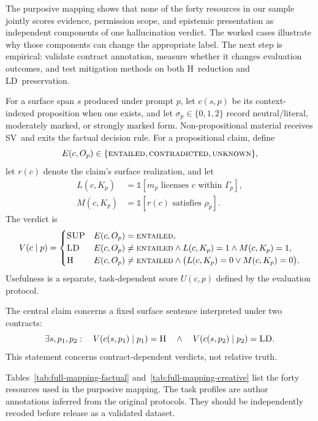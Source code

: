 \documentclass{clv2025}
\newcommand{\LD}{\textsc{LD}}
\newcommand{\Hall}{\textsc{H}}
\newcommand{\SUP}{\textsc{SUP}}
\newcommand{\SV}{\textsc{SV}}
\begin{document}
The purposive mapping shows that none of the forty resources in our sample jointly scores evidence, permission scope, and epistemic presentation as independent components of one hallucination verdict.
The worked cases illustrate why those components can change the appropriate label.
The next step is empirical: validate contract annotation, measure whether it changes evaluation outcomes, and test mitigation methods on both \Hall\ reduction and \LD\ preservation.

\appendix

\label{app:formal}

For a surface span $s$ produced under prompt $p$, let $c(s,p)$ be its context-indexed proposition when one exists, and let $\sigma_p\in\{0,1,2\}$ record neutral/literal, moderately marked, or strongly marked form.
Non-propositional material receives \SV\ and exits the factual decision rule.
For a propositional claim, define
\[
E(c,O_p)\in\{\textsc{entailed},\textsc{contradicted},\textsc{unknown}\},
\]
let $r(c)$ denote the claim's surface realization, and let
\begin{align*}
L(c,K_p)&=\mathbb{1}[m_p\text{ licenses }c\text{ within }\Gamma_p],\\
M(c,K_p)&=\mathbb{1}[r(c)\text{ satisfies }\rho_p].
\end{align*}
The verdict is
\[
V(c\mid p)=
\begin{cases}
\SUP & E(c,O_p)=\textsc{entailed},\\
\LD & E(c,O_p)\neq\textsc{entailed}\land L(c,K_p)=1\land M(c,K_p)=1,\\
\Hall & E(c,O_p)\neq\textsc{entailed}\land\bigl(L(c,K_p)=0\lor M(c,K_p)=0\bigr).
\end{cases}
\]
Usefulness is a separate, task-dependent score $U(c,p)$ defined by the evaluation protocol.

The central claim concerns a fixed surface sentence interpreted under two contracts:
\[
\exists s,p_1,p_2:\quad
V(c(s,p_1)\mid p_1)=\Hall
\quad\land\quad
V(c(s,p_2)\mid p_2)=\LD.
\]
This statement concerns contract-dependent verdicts, not relative truth.

\label{app:mapping}

Tables~\ref{tab:full-mapping-factual} and~\ref{tab:full-mapping-creative} list the forty resources used in the purposive mapping.
The task profiles are author annotations inferred from the original protocols.
They should be independently recoded before release as a validated dataset.
\end{document}
